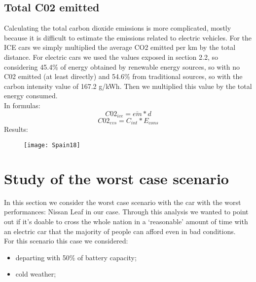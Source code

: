 \documentclass{article}
\begin{document}
\subsection{Total C02 emitted}
Calculating the total carbon dioxide emissions is more complicated, mostly because it is difficult to estimate the emissions related to electric vehicles.
For the ICE cars we simply multiplied the average CO2 emitted per km by the total distance. 
For electric cars we used the values exposed in section 2.2, so considering 45.4\% of energy obtained by renewable energy sources, so with no C02 emitted (at least directly) and 54.6\% from traditional sources, so with the carbon intensity value of 167.2 g/kWh. Then we multiplied this value by the total energy consumed.\\
In formulas:
\begin{equation}
C02_{ice}= \bar{em}*d
\end{equation}
\begin{equation}
C02_{evs}=C_{int}*E_{cons}
\end{equation}
Results:
\begin{figure}[H]
{\centering
\texttt{[image: Spain18]}
\caption{}}
\end{figure}
\newpage
\section{Study of the worst case scenario}
In this section we consider the worst case scenario with the car with the worst performances: Nissan Leaf in our case. Through this analysis we wanted to point out if it’s doable to cross the whole nation in a ‘reasonable’ amount of time with an electric car that the majority of people can afford even in bad conditions.\\
For this scenario this case we considered:
\begin{itemize}
\item departing with 50\% of battery capacity;
\item cold weather;
\end{itemize}
\end{document}
